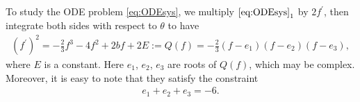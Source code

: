 \documentclass[reqno,12pt]{amsart}
\newtheorem{theorem}{Theorem}[section]
\begin{document}


To study the ODE problem \eqref{eq:ODEsys}, 
we multiply ${\eqref{eq:ODEsys}}_1$ by $2f^\prime$, then integrate both sides with respect to $\theta$ to have
\begin{align}\label{eq:f'square}
    (f^\prime)^2 = -\frac23 f^3 - 4f^2 + 2bf + 2E := Q(f)=  -\frac23 (f- e_1)(f-e_2) (f-e_3),
\end{align}
where $E$ is a constant.
Here $e_1$, $e_2$, $e_3$ are  roots of $Q(f)$, which may be complex. Moreover, it is easy to note that they satisfy the constraint
\begin{align}\label{roots}
    e_1 + e_2 + e_3 = -6.
\end{align} 
\end{document}

